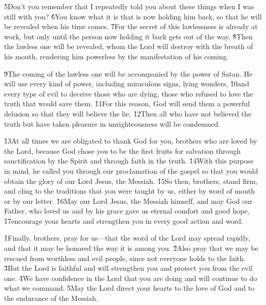 \v{5}Don't you remember that I repeatedly told you about these things when I was still with you? \v{6}You know what it is that is now holding him back, so that he will be revealed when his time comes. \v{7}For the secret of this lawlessness is already at work, but only until the person now holding it back gets out of the way. \v{8}Then the lawless one will be revealed, whom the Lord will destroy with the breath of his mouth, rendering him powerless by the manifestation of his coming.

\v{9}The coming of the lawless one will be accompanied by the power of Satan. He will use every kind of power, including miraculous signs, lying wonders, \v{10}and every type of evil to deceive those who are dying, those who refused to love the truth that would save them. \v{11}For this reason, God will send them a powerful delusion so that they will believe the lie. \v{12}Then all who have not believed the truth but have taken pleasure in unrighteousness will be condemned.

\v{13}At all times we are obligated to thank God for you, brothers who are loved by the Lord, because God chose you to be the first fruits for salvation through sanctification by the Spirit and through faith in the truth. \v{14}With this purpose in mind, he called you through our proclamation of the gospel so that you would obtain the glory of our Lord Jesus, the Messiah. \v{15}So then, brothers, stand firm, and cling to the traditions that you were taught by us, either by word of mouth or by our letter. \v{16}May our Lord Jesus, the Messiah himself, and may God our Father, who loved us and by his grace gave us eternal comfort and good hope, \v{17}encourage your hearts and strengthen you in every good action and word.

\v{1}Finally, brothers, pray for us---that the word of the Lord may spread rapidly, and that it may be honored the way it is among you. \v{2}Also pray that we may be rescued from worthless and evil people, since not everyone holds to the faith. \v{3}But the Lord is faithful and will strengthen you and protect you from the evil one. \v{4}We have confidence in the Lord that you are doing and will continue to do what we command. \v{5}May the Lord direct your hearts to the love of God and to the endurance of the Messiah.

